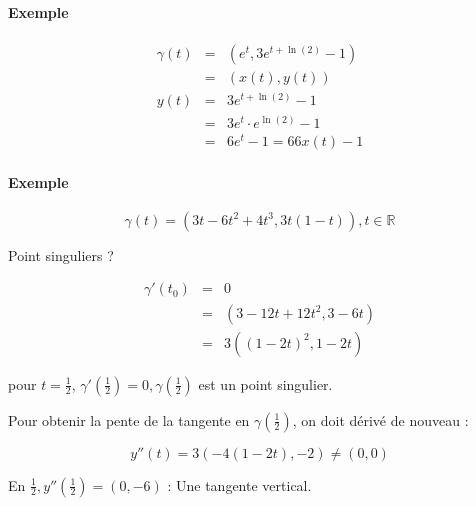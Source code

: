 \paragraph{Exemple} \[\begin{array}{rcl}
				\gamma(t) &=& (e^t, 3e^{t+\ln(2)}-1) \\
											   &=& (x(t), y(t)) \\
		y(t) &=& 3e^{t+\ln(2)} - 1 \\
			&=& 3e^t \cdot e^{\ln(2)} - 1 \\
		 &=& 6e^t - 1 = 6 6x(t) - 1\end{array}\]

\paragraph{Exemple}

\[\gamma(t) = (3t - 6t^2 + 4t^3, 3t(1-t)), t \in \mathbb{R}\]

Point singuliers ?

\[\begin{array}{rcl}
		\gamma'(t_0) &=& 0 \\
									&=& (3-12t + 12t^2, 3 - 6t) \\
						   &=& 3((1-2t)^2, 1-2t)\end{array}\]

		pour $t= \frac{1}{2}$, $\gamma'(\frac{1}{2}) = 0, \gamma(\frac{1}{2})$ est un point singulier.

Pour obtenir la pente de la tangente en $\gamma(\frac{1}{2})$, on doit dérivé de nouveau :

\[y''(t) = 3(-4(1-2t), -2) \neq (0, 0)\]

En $\frac{1}{2}, y''(\frac{1}{2}) = (0, -6)$ : Une tangente vertical.


